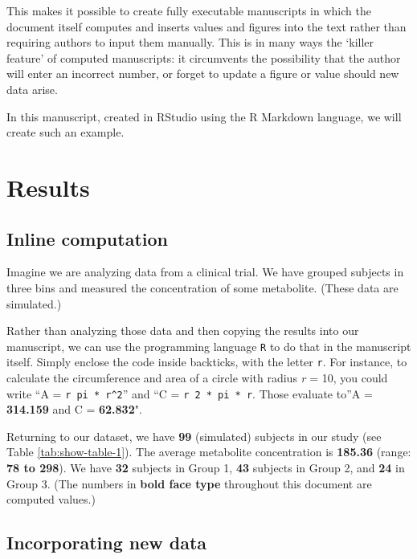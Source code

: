 \documentclass[smallextended]{svjour3}       %
\begin{document}
This makes it possible to create fully executable manuscripts in which the document itself computes and inserts values and figures into the text rather than requiring authors to input them manually. This is in many ways the `killer feature' of computed manuscripts: it circumvents the possibility that the author will enter an incorrect number, or forget to update a figure or value should new data arise.

In this manuscript, created in RStudio using the R Markdown language, we will create such an example.

\hypertarget{results}{%
\section{Results}\label{results}}

\hypertarget{sec:1}{%
\subsection{Inline computation}\label{sec:1}}

Imagine we are analyzing data from a clinical trial. We have grouped subjects in three bins and measured the concentration of some metabolite. (These data are simulated.)

Rather than analyzing those data and then copying the results into our manuscript, we can use the programming language \texttt{R} to do that in the manuscript itself. Simply enclose the code inside backticks, with the letter \texttt{r}. For instance, to calculate the circumference and area of a circle with radius \emph{r} = 10, you could write ``A = \texttt{\textasciigrave{}r\ pi\ *\ r\^{}2\textasciigrave{}}'' and ``C = \texttt{\textasciigrave{}r\ 2\ *\ pi\ *\ r\textasciigrave{}}. Those evaluate to''A = \textbf{314.159} and C = \textbf{62.832}".

Returning to our dataset, we have \textbf{99} (simulated) subjects in our study (see Table \ref{tab:show-table-1}). The average metabolite concentration is \textbf{185.36} (range: \textbf{78 to 298}). We have \textbf{32} subjects in Group 1, \textbf{43} subjects in Group 2, and \textbf{24} in Group 3. (The numbers in \textbf{bold face type} throughout this document are computed values.)

\hypertarget{sec:2}{%
\subsection{Incorporating new data}\label{sec:2}}
\end{document}

